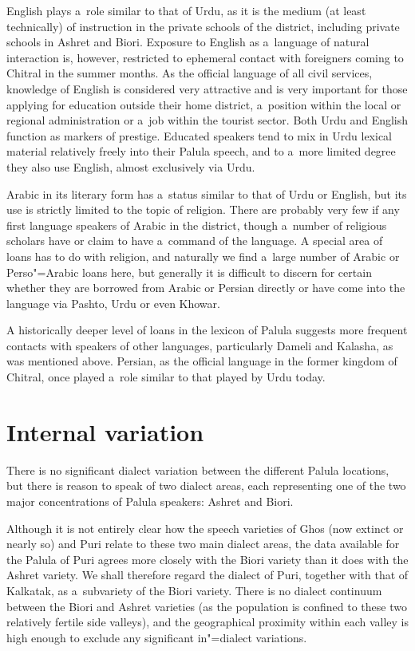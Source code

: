 English plays a~role similar to that of Urdu, as it is the medium (at least technically) of instruction in the private schools of the district, including private schools in Ashret and Biori. Exposure to English as a~language of natural interaction is, however, restricted to ephemeral contact with foreigners coming to Chitral in the summer months. As the official language of all civil services, knowledge of English is considered very attractive and is very important for those applying for education outside their home district, a~position within the local or regional administration or a~job within the tourist sector. Both Urdu and English function as markers of prestige. Educated speakers tend to mix in Urdu lexical material relatively freely into their Palula speech, and to a~more limited degree they also use English, almost exclusively via Urdu. 


Arabic in its literary form has a~status similar to that of Urdu or English, but its use is strictly limited to the topic of religion. There are probably very few if any first language speakers of Arabic in the district, though a~number of religious scholars have or claim to have a~command of the language. A special area of loans has to do with religion, and naturally we find a~large number of Arabic or Perso"=Arabic loans here, but generally it is difficult to discern for certain whether they are borrowed from Arabic or Persian directly or have come into the language via Pashto, Urdu or even Khowar.


A historically deeper level of loans in the lexicon of Palula suggests more frequent contacts with speakers of other languages, particularly Dameli and Kalasha, as was mentioned above. Persian, as the official language in the former kingdom of Chitral, once played a~role similar to that played by Urdu today. 


\section{Internal variation}
\label{sec:1-4}
\largerpage
There is no significant dialect variation between the different Palula locations, but there is reason to speak of two dialect areas, each representing one of the two major concentrations of Palula speakers: Ashret and Biori. 


Although it is not entirely clear how the speech varieties of Ghos (now extinct or nearly so) and Puri relate to these two main dialect areas, the data available for the Palula of Puri agrees more closely with the Biori variety than it does with the Ashret variety. We shall therefore regard the dialect of Puri, together with that of Kalkatak, as a~subvariety of the Biori variety. There is no dialect continuum between the Biori and Ashret varieties (as the population is confined to these two relatively fertile side valleys), and the geographical proximity within each valley is high enough to exclude any significant in"=dialect variations. 



